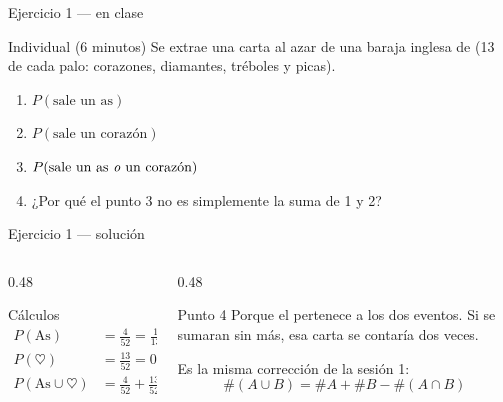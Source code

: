 \documentclass[aspectratio=169,10pt]{beamer}
\begin{document}
\begin{frame}{Ejercicio 1 — en clase}
  \begin{alertblock}{Individual (6 minutos)}
    Se extrae una carta al azar de una baraja inglesa de 
    (13 de cada palo: corazones, diamantes, tréboles y picas).

    \vspace{0.3cm}
    \begin{enumerate}
      \item $P(\text{sale un as})$
      \item $P(\text{sale un corazón})$
      \item $P(\text{sale un as \emph{o} un corazón})$
      \item ¿Por qué el punto 3 no es simplemente la suma de 1 y 2?
    \end{enumerate}
  \end{alertblock}
\end{frame}

\begin{frame}{Ejercicio 1 — solución}
  \begin{columns}[T,onlytextwidth]
    \begin{column}{0.48\textwidth}
      \begin{block}{Cálculos}
        \small
        \begin{align*}
          P(\text{As}) &= \tfrac{4}{52}=\tfrac{1}{13}=0{,}0769\\[0.25em]
          P(\heartsuit) &= \tfrac{13}{52}=0{,}25\\[0.25em]
          P(\text{As}\cup\heartsuit) &= \tfrac{4}{52}+\tfrac{13}{52}-\tfrac{1}{52}
             =\tfrac{16}{52}=0{,}3077
        \end{align*}
      \end{block}
    \end{column}
    \begin{column}{0.48\textwidth}
      \begin{exampleblock}{Punto 4}
        \footnotesize
        Porque el  pertenece a los dos eventos. Si se
        sumaran sin más, esa carta se contaría dos veces.

        \vspace{0.2cm}
        Es la misma corrección de la sesión 1:
        \[ \#(A\cup B)=\#A+\#B-\#(A\cap B) \]
      \end{exampleblock}
    \end{column}
  \end{columns}
\end{frame}
\end{document}
